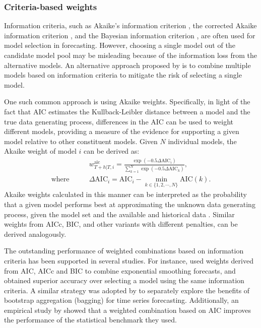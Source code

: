 \documentclass[a4paper,11pt]{article}
\begin{document}
\subsubsection*{Criteria-based weights}

Information criteria, such as Akaike's information criterion \citep[AIC,][]{Akaike1974-ya}, the corrected Akaike information criterion \citep[AICc,][]{Sugiura1978-xm}, and the Bayesian information criterion \citep[BIC,][]{Schwarz1978-cz}, are often used for model selection in forecasting. However, choosing a single model out of the candidate model pool may be misleading because of the information loss from the alternative models. An alternative approach proposed by \citet{Burnham2002-us} is to combine multiple models based on information criteria to mitigate the risk of selecting a single model.

One such common approach is using Akaike weights. Specifically, in light of the fact that AIC estimates the Kullback-Leibler distance \citep{Kullback1951-hl} between a model and the true data generating process, differences in the AIC can be used to weight different models, providing a measure of the evidence for supporting a given model relative to other constituent models. Given $N$ individual models, the Akaike weight of model $i$ can be derived as:
\begin{align*}
    & w_{T+h|T, i}^{\text{aic}}=\frac{\exp (-0.5 \Delta \mathrm{AIC}_{i})}{\sum_{k=1}^{N} \exp \left(-0.5 \Delta \mathrm{AIC}_{k}\right)}, \\
  \text{where}\qquad
    & \Delta \mathrm{AIC}_{i}=\mathrm{AIC}_{i}-\min _{k \in \{1,2,\cdots,N\}} \mathrm{AIC}(k).
\end{align*}
Akaike weights calculated in this manner can be interpreted as the probability that a given model performs best at approximating the unknown data generating process, given the model set and the available and historical data \citep{Kolassa2011-ai}. Similar weights from AICc, BIC, and other variants with different penalties, can be derived analogously.

The outstanding performance of weighted combinations based on information criteria has been supported in several studies. For instance, \citet{Kolassa2011-ai} used weights derived from AIC, AICc and BIC to combine exponential smoothing forecasts, and obtained superior accuracy over selecting a model using the same information criteria. A similar strategy was adopted by \citet{Petropoulos2018-fw} to separately explore the benefits of bootstrap aggregation (bagging) for time series forecasting. Additionally, an empirical study by \citet{Petropoulos2018-ad} showed that a weighted combination based on AIC improves the performance of the statistical benchmark they used.
\end{document}
